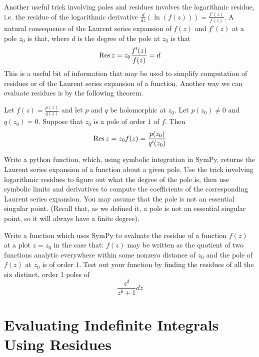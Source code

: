 Another useful trick involving poles and residues involves the logarithmic residue, i.e. the residue of the logarithmic derivative $\frac{d}{dz}(\ln(f(z))) = \frac{f'(z)}{f(z)}$.
A natural consequence of the Laurent series expansion of $f(z)$ and $f'(z)$ at a pole $z_0$ is that, where $d$ is the degree of the pole at $z_0$ is that
\begin{equation*}
\operatorname{Res}{z=z_0} \frac{f'(z)}{f(z)} = d
\end{equation*}
This is a useful bit of information that may be used to simplify computation of residues or of the Laurent series expansion of a function. 
Another way we can evaluate residues is by the following theorem.
\begin{theorem}
Let $f(z)=\frac{p(z)}{q(z)}$ and let $p$ and $q$ be holomorphic at $z_0$. Let $p(z_0) \neq 0$ and $q(z_0)=0$. Suppose that $z_0$ is a pole of order $1$ of $f$. Then 
\begin{equation*}
\operatorname{Res}{z=z_0} f(z) = \frac{p(z_0)}{q'(z_0)}
\end{equation*}
\end{theorem}

\begin{problem}
Write a python function, which, using symbolic integration in SymPy, returns the Laurent series expansion of a function about a given pole.
Use the trick involving logarithmic residues to figure out what the degree of the pole is, then use symbolic limits and derivatives to compute the coefficients of the corresponding Laurent series expansion.
You may assume that the pole is not an essential singular point.
(Recall that, as we defined it, a pole is not an essential singular point, so it will always have a finite degree).
\end{problem}

\begin{problem}
Write a function which uses SymPy to evaluate the residue of a function $f(z)$ at a plot $z=z_0$ in the case that: $f(z)$ may be written as the quotient of two functions analytic everywhere within some nonzero distance of $z_0$ and the pole of $f(z)$ at $z_0$ is of order $1$.
Test out your function by finding the residues of all the six distinct, order 1 poles of 
$$\frac{z^2}{z^6+1}dz$$
\end{problem}

\section*{Evaluating Indefinite Integrals Using Residues}

